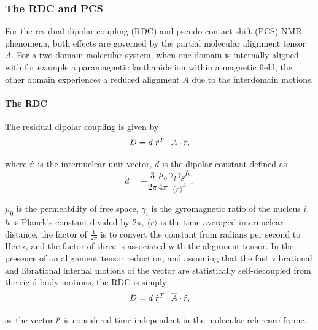 
\subsubsection{The RDC and PCS}

For the residual dipolar coupling (RDC) and pseudo-contact shift (PCS) NMR phenomena, both effects are governed by the partial molecular alignment tensor $A$.
For a two domain molecular system, when one domain is internally aligned with for example a paramagnetic lanthanide ion within a magnetic field, the other domain experiences a reduced alignment $\overline{A}$ due to the interdomain motions.


\paragraph{The RDC}

The residual dipolar coupling is given by
\begin{equation} \label{eq: RDC equation}
    D = d \; \hat{r}^T \cdot A \cdot \hat{r} ,
\end{equation}

where $\hat{r}$ is the internuclear unit vector, $d$ is the dipolar constant defined as
\begin{equation} \label{eq: dipolar constant}
    d = - \frac{3}{2\pi} \frac{\mu_0}{4\pi} \frac{\gamma_I \gamma_S \hbar}{\langle r \rangle^3} ,
\end{equation}

$\mu_0$ is the permeability of free space, $\gamma_i$ is the gyromagnetic ratio of the nucleus $i$, $\hbar$ is Planck's constant divided by $2\pi$, $\langle r \rangle$ is the time averaged internuclear distance, the factor of $\tfrac{1}{2\pi}$ is to convert the constant from radians per second to Hertz, and the factor of three is associated with the alignment tensor.
In the presence of an alignment tensor reduction, and assuming that the fast vibrational and librational internal motions of the vector are statistically self-decoupled from the rigid body motions, the RDC is simply
\begin{equation} \label{eq: reduced RDC equation}
    D = d \; \hat{r}^T \cdot \overline{A} \cdot \hat{r} ,
\end{equation}

as the vector $\hat{r}$ is considered time independent in the molecular reference frame.


